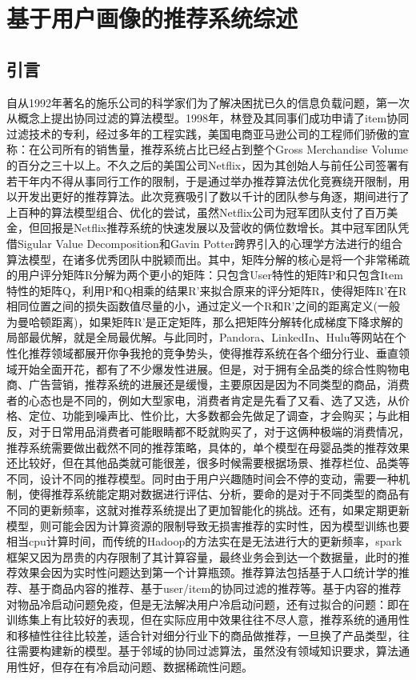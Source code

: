 \chapter{基于用户画像的推荐系统综述}
	\section{引言}
	自从1992年著名的施乐公司的科学家们为了解决困扰已久的信息负载问题，第一次从概念上提出协同过滤的算法模型。1998年，林登及其同事们成功申请了item协同过滤技术的专利，经过多年的工程实践，美国电商亚马逊公司的工程师们骄傲的宣称：在公司所有的销售量，推荐系统占比已经占到整个Gross Merchandise Volume的百分之三十以上。不久之后的美国公司Netflix，因为其创始人与前任公司签署有若干年内不得从事同行工作的限制，于是通过举办推荐算法优化竞赛绕开限制，用以开发出更好的推荐算法。此次竞赛吸引了数以千计的团队参与角逐，期间进行了上百种的算法模型组合、优化的尝试，虽然Netflix公司为冠军团队支付了百万美金，但回报是Netflix推荐系统的快速发展以及营收的俩位数增长。其中冠军团队凭借Sigular Value Decomposition和Gavin Potter跨界引入的心理学方法进行的组合算法模型，在诸多优秀团队中脱颖而出。其中，矩阵分解的核心是将一个非常稀疏的用户评分矩阵R分解为两个更小的矩阵：只包含User特性的矩阵P和只包含Item特性的矩阵Q，利用P和Q相乘的结果R'来拟合原来的评分矩阵R，使得矩阵R'在R相同位置之间的损失函数值尽量的小，通过定义一个R和R'之间的距离定义(一般为曼哈顿距离)，如果矩阵R'是正定矩阵，那么把矩阵分解转化成梯度下降求解的局部最优解，就是全局最优解。与此同时，Pandora、LinkedIn、Hulu等网站在个性化推荐领域都展开你争我抢的竞争势头，使得推荐系统在各个细分行业、垂直领域开始全面开花，都有了不少爆发性进展。但是，对于拥有全品类的综合性购物电商、广告营销，推荐系统的进展还是缓慢，主要原因是因为不同类型的商品，消费者的心态也是不同的，例如大型家电，消费者肯定是先看了又看、选了又选，从价格、定位、功能到噪声比、性价比，大多数都会先做足了调查，才会购买；与此相反，对于日常用品消费者可能眼睛都不眨就购买了，对于这俩种极端的消费情况，推荐系统需要做出截然不同的推荐策略，具体的，单个模型在母婴品类的推荐效果还比较好，但在其他品类就可能很差，很多时候需要根据场景、推荐栏位、品类等不同，设计不同的推荐模型。同时由于用户兴趣随时间会不停的变动，需要一种机制，使得推荐系统能定期对数据进行评估、分析，要命的是对于不同类型的商品有不同的更新频率，这就对推荐系统提出了更加智能化的挑战。还有，如果定期更新模型，则可能会因为计算资源的限制导致无损害推荐的实时性，因为模型训练也要相当cpu计算时间，而传统的Hadoop的方法实在是无法进行大的更新频率，spark框架又因为昂贵的内存限制了其计算容量，最终业务会到达一个数据量，此时的推荐效果会因为实时性问题达到第一个计算瓶颈。推荐算法包括基于人口统计学的推荐\citep{social-filter}、基于商品内容的推荐\citep{content-based}、基于user/item的协同过滤\citep{collab-filter}的推荐等。基于内容的推荐\citep{recmd_content_based}对物品冷启动问题免疫，但是无法解决用户冷启动问题\citep{cold-start}，还有过拟合的问题：即在训练集上有比较好的表现，但在实际应用中效果往往不尽人意，推荐系统的通用性和移植性往往比较差，适合针对细分行业下的商品做推荐，一旦换了产品类型，往往需要构建新的模型。基于邻域的协同过滤算法，虽然没有领域知识要求，算法通用性好，但存在有冷启动问题、数据稀疏性问题。

